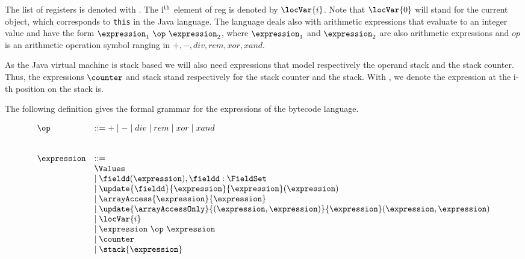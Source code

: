 The list of registers is denoted with \locVarOnly. The $\rm{i^{th}}$ element of \textrm{reg} is denoted by 
$\locVar{i}$. Note that $\locVar{0}$ will stand for the current object, 
which corresponds to \texttt{this} in the Java language. 
 The language deals also with arithmetic expressions that evaluate to an integer value and have the form $\expression_1 \ \op \ \expression_2 $,
 where  $ \expression_1$ and $\expression_2$ are also arithmetic expressions and $op$ is an arithmetic operation symbol
 ranging in $+, - , div, rem , xor, xand $. 

As the Java virtual machine is stack based we will also 
need expressions that model respectively the operand stack and the stack counter.
Thus, the expressions $\counter$ and  \textrm{stack} stand respectively for the stack counter and the stack. 
With , we denote the expression at the \textrm{i}-th position 
on the stack is. 


The following definition gives the formal grammar for the expressions of the bytecode language.
\begin{Expression} \label{expr}
    
\end{Expression}

  $$ 
  \begin{array}{ll}  
    \op             & ::= + \mid - \mid div \mid rem \mid xor \mid xand  \\
		    &                                                \\
		    &                                                \\
    \expression     & ::= \\
                    &  \Values \\
	            &  \mid  \fieldd(\expression), \fieldd : \FieldSet \\
		    &  \mid  \update{\fieldd}{ \expression}{\expression}(\expression) \\
		    &  \mid  \arrayAccess{\expression} {\expression} \\	   
		    &  \mid \update{ \arrayAccessOnly}{ (\expression , \expression)}{ \expression} (\expression,\expression) \\	
		    &  \mid  \locVar{i} \\ 
		    &  \mid  \expression \ \op \ \expression   \\
		    &  \mid  \counter \\
		    &  \mid  \stack{ \expression} \\
 \end{array} 
 $$






